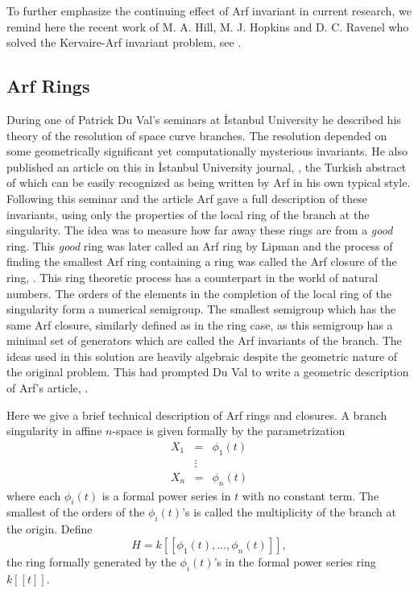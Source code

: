 \documentclass[12pt]{amsart}
\begin{document}
To further  emphasize the continuing effect of Arf invariant in current research, we remind here the recent work of M. A. Hill, M. J. Hopkins and D. C. Ravenel who solved the Kervaire-Arf invariant problem,  see \cite{hill1,hill2,hill3}.

\subsection{Arf Rings}
During one of  Patrick Du Val's seminars at {\.I}stanbul University he described his theory of the resolution of space curve branches. The resolution depended on some geometrically significant yet computationally mysterious invariants. He also published an article on this in {\.I}stanbul University journal, \cite{duval1}, the Turkish abstract of which can be easily recognized as being written by Arf in his own typical style. Following this seminar and the article Arf gave a full description of these invariants, using only the properties of the local ring of the branch at the singularity. The idea was to measure how far away these rings are from a {\it good} ring. This {\it good} ring was later called an Arf ring by Lipman and the process of finding the smallest Arf ring containing a ring was called the Arf closure of the ring, \cite{lipman}. This ring theoretic process
has a counterpart in the world of natural numbers. The orders of the elements in the completion of the local ring of the singularity form a numerical semigroup. The smallest semigroup which has the same Arf closure, similarly defined as in the ring case, as this semigroup has a minimal set of generators which are called the Arf invariants of the branch. The ideas used in this solution are heavily algebraic despite the geometric nature of the original problem. This had prompted Du Val to write a geometric description of Arf's article, \cite{duval2}.

Here we give a brief technical description of Arf rings and closures. A branch singularity in affine $n$-space is given formally by the parametrization
\begin{eqnarray*}
X_1&=&\phi_1(t) \\
&\vdots& \\
X_n &=&\phi_n(t)
\end{eqnarray*}
where each $\phi_i(t)$ is a formal power series in $t$ with no constant term. The smallest of the orders of the $\phi_i(t)$'s is called the multiplicity of the branch at the origin. Define
\[ H=k[[\phi_1(t),\dots,\phi_n(t)]], \]
the ring formally generated by the $\phi_i(t)$'s in the formal power series ring $k[[t]]$.
\end{document}
